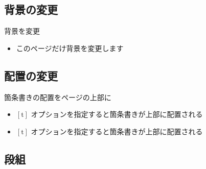 \subsection{背景の変更}
{
\begin{frame}{背景を変更}
  \begin{itemize}
    \item このページだけ背景を変更します
  \end{itemize}
\end{frame}
}

\subsection{配置の変更}

\begin{frame}[t]{箇条書きの配置をページの上部に}
  \begin{itemize}
    \item $[\mbox{t}]$ オプションを指定すると箇条書きが上部に配置される
    \item $[\mbox{t}]$ オプションを指定すると箇条書きが上部に配置される
  \end{itemize}
\end{frame}

\subsection{段組}

